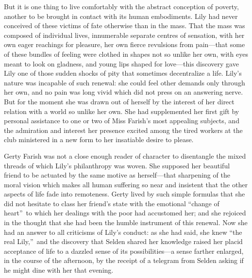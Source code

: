 \documentclass[12pt,a4paper]{book}
\begin{document}
But it is one thing to live comfortably with the abstract
conception of poverty, another to be brought in contact with its
human embodiments. Lily had never conceived of these victims of
fate otherwise than in the mass. That the mass was composed of
individual lives, innumerable separate centres of sensation, with
her own eager reachings for pleasure, her own fierce revulsions
from pain---that some of these bundles of feeling were clothed in
shapes not so unlike her own, with eyes meant to look on
gladness, and young lips shaped for love---this discovery gave
Lily one of those sudden shocks of pity that sometimes
decentralize a life. Lily's nature was incapable of such renewal: 
she could feel other demands only through her own, and no pain
was long vivid which did not press on an answering nerve. But for
the moment she was drawn out of herself by the interest of her
direct relation with a world so unlike her own. She had
supplemented her first gift by personal assistance to one or two
of Miss Farish's most appealing subjects, and the admiration and
interest her presence excited among the tired workers at the club
ministered in a new form to her insatiable desire to please.





Gerty Farish was not a close enough reader of character to
disentangle the mixed threads of which Lily's philanthropy was
woven. She supposed her beautiful friend to be actuated by the
same motive as herself---that sharpening of the moral
vision which makes all human suffering so near and insistent that
the other aspects of life fade into remoteness. Gerty lived by
such simple formulas that she did not hesitate to class her
friend's state with the emotional ``change of heart''\ to which her
dealings with the poor had accustomed her; and she rejoiced in
the thought that she had been the humble instrument of this
renewal. Now she had an answer to all criticisms of Lily's
conduct: as she had said, she knew ``the real Lily,''\ and the
discovery that Selden shared her knowledge raised her placid
acceptance of life to a dazzled sense of its possibilities---a
sense farther enlarged, in the course of the afternoon, by the
receipt of a telegram from Selden asking if he might dine with
her that evening.
\end{document}
